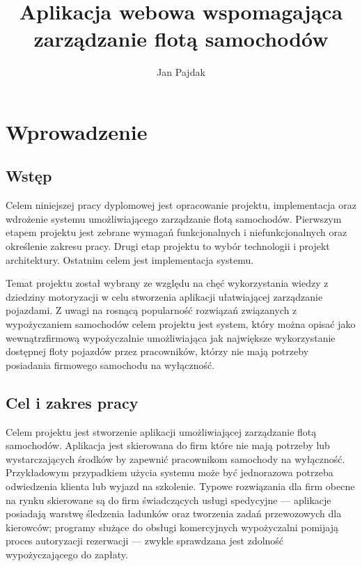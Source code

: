 \documentclass[eng,printmode,openany]{mgr}
\title{Aplikacja webowa wspomagająca zarządzanie flotą samochodów}
\author{Jan Pajdak}
\begin{document}
	
	\renewcommand{\bibname}{Literatura} 
	\appendixpageoff
	\maketitle
	
	\tableofcontents 
	
	\newpage
	\listoffigures
	
	\newpage
	\listoftables
	
	\newpage
	\lstlistoflistings
	
	
	\newpage
	\chapter{Wprowadzenie}
	\section{Wstęp}
	Celem niniejszej pracy dyplomowej jest opracowanie projektu, implementacja oraz wdrożenie systemu umożliwiającego zarządzanie flotą samochodów. Pierwszym etapem projektu jest zebrane wymagań funkcjonalnych i niefunkcjonalnych oraz określenie zakresu pracy. Drugi etap projektu to wybór technologii i projekt architektury. Ostatnim celem jest implementacja systemu.
	
	Temat projektu został wybrany ze względu na chęć wykorzystania wiedzy z dziedziny motoryzacji w celu stworzenia aplikacji ułatwiającej zarządzanie pojazdami. Z uwagi na rosnącą popularność rozwiązań związanych z wypożyczaniem samochodów celem projektu jest system, który można opisać jako wewnątrzfirmową wypożyczalnie umożliwiająca jak największe wykorzystanie dostępnej floty pojazdów przez pracowników, którzy nie mają potrzeby posiadania firmowego samochodu na wyłączność. 
	
	\section{Cel i zakres pracy}
	Celem projektu jest stworzenie aplikacji umożliwiającej zarządzanie flotą samochodów. Aplikacja jest skierowana do firm które nie mają potrzeby lub wystarczających środków by zapewnić pracownikom samochody na wyłączność. Przykładowym przypadkiem użycia systemu może być jednorazowa potrzeba odwiedzenia klienta lub wyjazd na szkolenie. Typowe rozwiązania dla firm obecne na rynku skierowane są do firm świadczących usługi spedycyjne — aplikacje posiadają warstwę śledzenia ładunków oraz tworzenia zadań przewozowych dla kierowców; programy służące do obsługi komercyjnych wypożyczalni pomijają proces autoryzacji rezerwacji — zwykle sprawdzana jest zdolność wypożyczającego do zapłaty.
	
\end{document}
